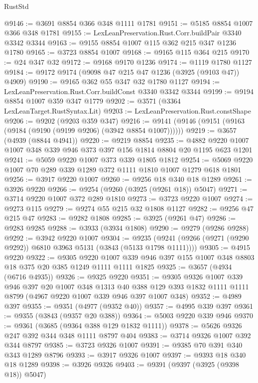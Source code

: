 \begin{lexlean}{RustStd}
\begin{coremodule}
@9146 := @3691 @8854 @366 @348 @1111 @1781
@9151 := @5185 @8854 @1007 @366 @348 @1781
@9155 := LexLeanPreservation.Rust.Corr.buildPair @3340 @3342 @3344
@9163 := @9155 @8854 @1007 @115 @362 @215 @347 @1236 @1780
@9165 := @3723 @8854 @1007
@9168 := @9165 @115 @364 @215
@9170 := @24 @347 @32
@9172 := @9168 @9170 @1236
@9174 := @1119 @1780 @1127
@9184 := @9172 @9174 (@9098 @47 @215 @47 @1236 (@3925 (@9103 @47)) @4909)
@9190 := @9165 @362 @55 @347 @32 @1780 @1127
@9194 := LexLeanPreservation.Rust.Corr.buildConst @3340 @3342 @3344
@9199 := @9194 @8854 @1007 @359 @347 @1779
@9202 := @3571 (@3364 LexLeanTarget.RustSyntax.Lit)
@9203 := LexLeanPreservation.Rust.constShape
@9206 := @9202 (@9203 @359 @347)
@9216 := @9141 (@9146 (@9151 (@9163 (@9184 (@9190 (@9199 @9206) (@3942 @8854 @1007))))))
@9219 := @3657 (@4939 (@8844 @4941))
@9220 := @9219 @8854
@9235 := @4882 @9220 @1007 @1007 @348 @339 @946 @373 @397 @156 @1814 @8804 @20 @1195 @623 @1201
@9241 := @5059 @9220 @1007 @373 @339 @1805 @1812
@9254 := @5069 @9220 @1007 @70 @289 @339 @1289 @372 @1111 @1810 @1007 @1279 @618 @1801
@9256 := @3917 @9220 @1007
@9260 := @9256 @18 @340 @18 @1289
@9261 := @3926 @9220
@9266 := @9254 (@9260 (@3925 (@9261 @18)) @5047)
@9271 := @3714 @9220 @1007 @372 @289 @1810
@9273 := @3723 @9220 @1007
@9274 := @9273 @115
@9279 := @9274 @55 @215 @32 @1808 @1127
@9282 := @9256 @47 @215 @47
@9283 := @9282 @1808
@9285 := @3925 (@9261 @47)
@9286 := @9283 @9285
@9288 := @3933 (@3934 @1808)
@9290 := @9279 (@9286 @9288)
@9292 := @3942 @9220 @1007
@9304 := @9235 (@9241 (@9266 (@9271 (@9290 @9292)) @6810 @3963 @5131 (@3843 (@5133 @1798 @1111))))
@9305 := @4915 @9220
@9322 := @9305
    @9220
    @1007
    @339
    @946
    @397
    @155
    @1007
    @348
    @8803
    @18
    @375
    @20
    @385
    @1249
    @1111
    @1111
    @1825
@9325 := @3657 (@4934 (@6716 @4935))
@9326 := @9325 @9220
@9351 := @9305
    @9326
    @1007
    @339
    @946
    @397
    @20
    @1007
    @348
    @1313
    @40
    @388
    @129
    @393
    @1832
    @1111
    @1111
    @8799
    (@4967 @9220 @1007 @339 @946 @397 @1007 @348)
@9352 := @4989 @397
@9355 := @9351 (@4977 (@9352 @40))
@9357 := @4995 @339 @397
@9361 := @9355 (@3843 (@9357 @20 @388))
@9364 := @5003 @9220 @339 @946
@9370 := @9361 (@3685 (@9364 @388 @129 @1832 @1111))
@9378 := @5626 @9326 @247 @392 @344 @348 @1111 @8797 @404
@9383 := @3714 @9326 @1007 @392 @344 @8797
@9385 := @3723 @9326 @1007
@9391 := @9385 @70 @391 @340 @343 @1289 @8796
@9393 := @3917 @9326 @1007
@9397 := @9393 @18 @340 @18 @1289
@9398 := @3926 @9326
@9403 := @9391 (@9397 (@3925 (@9398 @18)) @5047)

\end{coremodule}
\end{lexlean}
